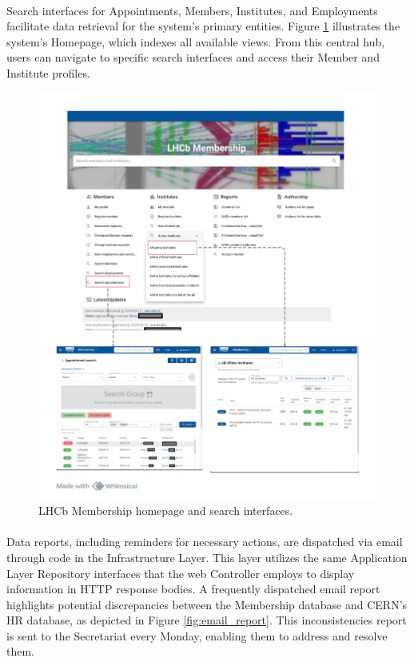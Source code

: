 \paragraph{} Search interfaces for Appointments, Members, Institutes, and Employments facilitate data retrieval for the system's primary entities. Figure \ref{fig:homepage} illustrates the system's Homepage, which indexes all available views. From this central hub, users can navigate to specific search interfaces and access their Member and Institute profiles.

\begin{figure} [H]
    \centering
    \includegraphics[width=1\linewidth]{figuras/homepage.png}
    \caption{LHCb Membership homepage and search interfaces.}
    \label{fig:homepage}
\end{figure}


\paragraph{} Data reports, including reminders for necessary actions, are dispatched via email through code in the Infrastructure Layer. This layer utilizes the same Application Layer Repository interfaces that the web Controller employs to display information in HTTP response bodies. A frequently dispatched email report highlights potential discrepancies between the Membership database and CERN's HR database, as depicted in Figure \ref{fig:email_report}. This inconsistencies report is sent to the Secretariat every Monday, enabling them to address and resolve them.

